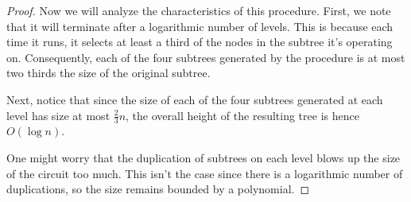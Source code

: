 \documentclass[11pt,letterpaper]{article}
\begin{document}
\begin{proof}
    Now we will analyze the characteristics of this procedure. First, we note
    that it will terminate after a logarithmic number of levels. This is
    because each time it runs, it selects at least a third of the nodes in the
    subtree it's operating on. Consequently, each of the four subtrees
    generated by the procedure is at most two thirds the size of the original
    subtree.

    Next, notice that since the size of each of the four subtrees generated at
    each level has size at most $\frac{2}{3}n$, the overall height of the
    resulting tree is hence $O(\log n)$.

    One might worry that the duplication of subtrees on each level blows up the
    size of the circuit too much. This isn't the case since there is a
    logarithmic number of duplications, so the size remains bounded by a
    polynomial.
\end{proof}
\end{document}
